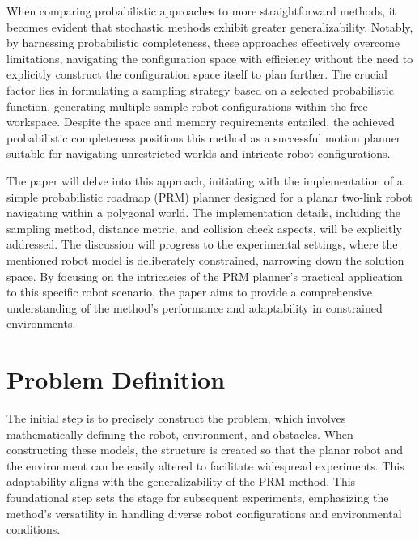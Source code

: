 \documentclass{IEEEtaes}
\begin{document}
When comparing probabilistic approaches to more straightforward methods, it becomes evident that stochastic methods exhibit greater generalizability. Notably, by harnessing probabilistic completeness, these approaches effectively overcome limitations, navigating the configuration space with efficiency without the need to explicitly construct the configuration space itself to plan further. The crucial factor lies in formulating a sampling strategy based on a selected probabilistic function, generating multiple sample robot configurations within the free workspace. Despite the space and memory requirements entailed, the achieved probabilistic completeness positions this method as a successful motion planner suitable for navigating unrestricted worlds and intricate robot configurations. 

The paper will delve into this approach, initiating with the implementation of a simple probabilistic roadmap (PRM) planner designed for a planar two-link robot navigating within a polygonal world. The implementation details, including the sampling method, distance metric, and collision check aspects, will be explicitly addressed. The discussion will progress to the experimental settings, where the mentioned robot model is deliberately constrained, narrowing down the solution space. By focusing on the intricacies of the PRM planner's practical application to this specific robot scenario, the paper aims to provide a comprehensive understanding of the method's performance and adaptability in constrained environments.

\section{\large \textbf{Problem Definition}}

\begin{figure}[t!]
    \centering
    \vspace{0.5em}
\end{figure}

The initial step is to precisely construct the problem, which involves mathematically defining the robot, environment, and obstacles. When constructing these models, the structure is created so that the planar robot and the environment can be easily altered to facilitate widespread experiments. This adaptability aligns with the generalizability of the PRM method. This foundational step sets the stage for subsequent experiments, emphasizing the method's versatility in handling diverse robot configurations and environmental conditions.
\end{document}
